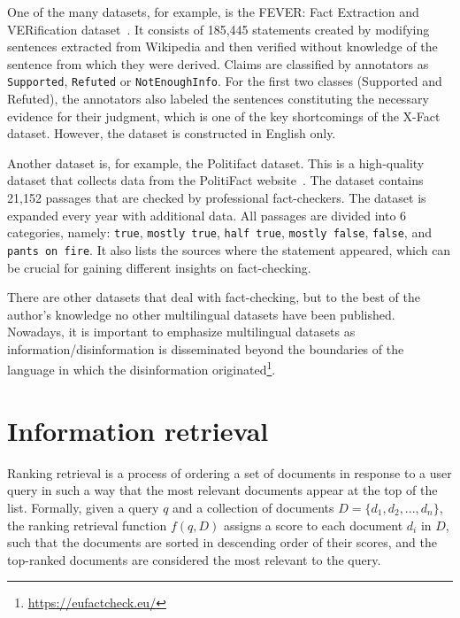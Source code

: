 One of the many datasets, for example, is the FEVER: Fact Extraction and VERification dataset~\cite{fever}. It consists of 185,445 statements created by modifying sentences extracted from Wikipedia and then verified without knowledge of the sentence from which they were derived. Claims are classified by annotators as \texttt{Supported}, \texttt{Refuted} or \texttt{NotEnoughInfo}. For the first two classes (Supported and Refuted), the annotators also labeled the sentences constituting the necessary evidence for their judgment, which is one of the key shortcomings of the X-Fact dataset. However, the dataset is constructed in English only.

Another dataset is, for example, the Politifact dataset. This is a high-quality dataset that collects data from the PolitiFact website~\cite{politifact}. The dataset contains 21,152 passages that are checked by professional fact-checkers. The dataset is expanded every year with additional data. All passages are divided into 6 categories, namely: \texttt{true}, \texttt{mostly true}, \texttt{half true}, \texttt{mostly false}, \texttt{false}, and \texttt{pants on fire}. It also lists the sources where the statement appeared, which can be crucial for gaining different insights on fact-checking.

There are other datasets \cite{covert}\cite{fakenewsnet}\cite{liar} that deal with fact-checking, but to the best of the author's knowledge no other multilingual datasets have been published. Nowadays, it is important to emphasize multilingual datasets as information/disinformation is disseminated beyond the boundaries of the language in which the disinformation originated\footnote{\url{https://eufactcheck.eu/}}.


\chapter{Information retrieval}\label{c4}
Ranking retrieval is a process of ordering a set of documents in response to a user query in such a way that the most relevant documents appear at the top of the list. Formally, given a query $q$ and a collection of documents $D = \{d_1, d_2, ..., d_n\}$, the ranking retrieval function $f(q,D)$ assigns a score to each document $d_i$ in $D$, such that the documents are sorted in descending order of their scores, and the top-ranked documents are considered the most relevant to the query.

